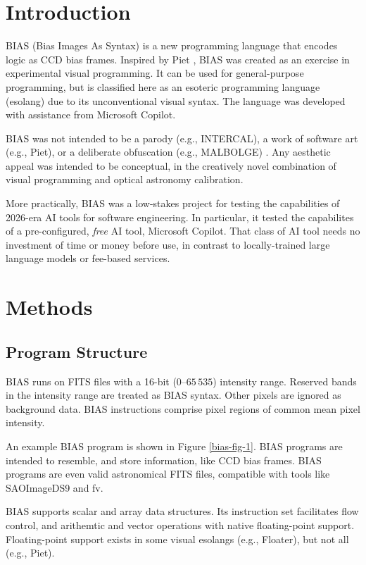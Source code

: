 \documentclass[11pt,twoside]{article}
\begin{document}
\section{Introduction}
BIAS (Bias Images As Syntax) is a new programming language that encodes logic as CCD bias frames. Inspired by Piet \citep{2024MinMa..34.S139B}, BIAS was created as an exercise in experimental visual programming. It can be used for general-purpose programming, but is classified here as an esoteric programming language (esolang) due to its unconventional visual syntax. The language was developed with assistance from Microsoft Copilot.

BIAS was not intended to be a parody (e.g., \textsc{INTERCAL}), a work of software art (e.g., Piet), or a deliberate obfuscation (e.g., MALBOLGE) \citep{2005DAC..conf..144M, 2012CPCA.book..235M, 2020SIHIRbook..691D}. Any aesthetic appeal was intended to be conceptual, in the creatively novel combination of visual programming and optical astronomy calibration.

More practically, BIAS was a low-stakes project for testing the capabilities of 2026-era AI tools for software engineering. In particular, it tested the capabilites of a pre-configured, \textit{free} AI tool, Microsoft Copilot. That class of AI tool needs no investment of time or money before use, in contrast to locally-trained large language models or fee-based services.

\section{Methods}
\subsection{Program Structure}
BIAS runs on FITS files with a 16-bit ($0\textrm{--}65\,535$) intensity range. Reserved bands in the intensity range are treated as BIAS syntax. Other pixels are ignored as background data. BIAS instructions comprise pixel regions of common mean pixel intensity.

An example BIAS program is shown in Figure \ref{bias-fig-1}. BIAS programs are intended to resemble, and store information, like CCD bias frames. BIAS programs are even valid astronomical FITS files, compatible with tools like SAOImageDS9 and fv.

BIAS supports scalar and array data structures. Its instruction set facilitates flow control, and arithemtic and vector operations with native floating-point support. Floating-point support exists in some visual esolangs (e.g., Floater), but not all (e.g., Piet).
\end{document}
